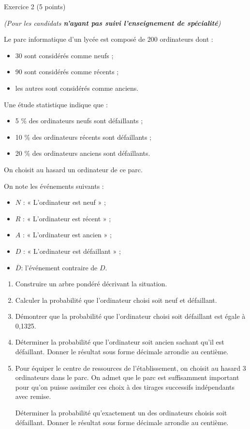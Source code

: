 
%
\begin{h2}Exercice 2 (5 points)\end{h2}
\par
\textit{(Pour les candidats \textbf{n'ayant pas suivi l'enseignement de spécialité})}
\par
Le parc informatique d'un lycée est composé de 200 ordinateurs dont :
\begin{itemize}
     \item
     30 sont considérés comme neufs ;
     \item
     90 sont considérés comme récents ;
     \item
     les autres sont considérés comme anciens.
\end{itemize}
Une étude statistique indique que :
\begin{itemize}
     \item
     5 \% des ordinateurs neufs sont défaillants ;
     \item
     10 \% des ordinateurs récents sont défaillants ;
     \item
     20 \% des ordinateurs anciens sont défaillants.
\end{itemize}
On choisit au hasard un ordinateur de ce parc.
\par
On note les événements suivants :
\begin{itemize}
     \item
     $N$ : « L'ordinateur est neuf » ;
     \item
     $R$ : « L'ordinateur est récent » ;
     \item
     $A$ : « L'ordinateur est ancien » ;
     \item
     $D$ : « L'ordinateur est défaillant » ;
     \item
     $\overline{D} $: l'événement contraire de $D$.
\end{itemize}
\begin{enumerate}
     \item
     Construire un arbre pondéré décrivant la situation.
     \item
     Calculer la probabilité que l'ordinateur choisi soit neuf et défaillant.
     \item
     Démontrer que la probabilité que l'ordinateur choisi soit défaillant est égale à 0,1325.
     \item
     Déterminer la probabilité que l'ordinateur soit ancien sachant qu'il est défaillant. Donner le résultat sous forme décimale arrondie au centième.
     \item
     Pour équiper le centre de ressources de l'établissement, on choisit au hasard 3 ordinateurs dans le parc. On admet que le parc est suffisamment important pour qu'on puisse assimiler ces choix à des tirages successifs indépendants avec remise.
     \par
     Déterminer la probabilité qu'exactement un des ordinateurs choisis soit défaillant. Donner le résultat sous forme décimale arrondie au centième.
\end{enumerate}
